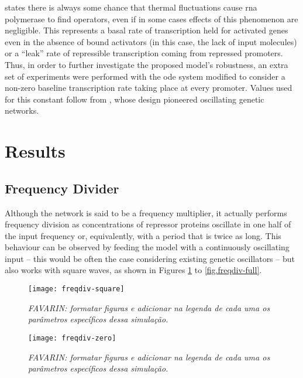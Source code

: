   \citet{ingalls} states there is always some chance that thermal fluctuations cause \acs{rna} polymerase to find operators, even if in some cases effects of this phenomenon are negligible.
  This represents a basal rate of transcription held for activated genes even in the absence of bound activators (in this case, the lack of input molecules) or a ``leak'' rate of repressible transcription coming from repressed promoters.
  Thus, in order to further investigate the proposed model's robustness, an extra set of experiments were performed with the \ac{ode} system modified to consider a non-zero baseline transcription rate taking place at every promoter.
  Values used for this constant follow from \citet{repressilator}, whose design pioneered oscillating genetic networks.


\section{Results}

  \subsection{Frequency Divider}

    Although the network is said to be a frequency multiplier, it actually performs frequency division as concentrations of repressor proteins oscillate in one half of the input frequency or, equivalently, with a period that is twice as long.
    This behaviour can be observed by feeding the model with a continuously oscillating input -- this would be often the case considering existing genetic oscillators -- but also works with square waves, as shown in Figures \ref{fig.freqdiv-square} to \ref{fig.freqdiv-full}.

    \begin{figure}[!htbp]
      \centering
      \texttt{[image: freqdiv-square]}
      \caption{\textit{FAVARIN: formatar figuras e adicionar na legenda de cada uma os parâmetros específicos dessa simulação.}}
      \label{fig.freqdiv-square}
    \end{figure}

    \begin{figure}[!htbp]
      \centering
      \texttt{[image: freqdiv-zero]}
      \caption{\textit{FAVARIN: formatar figuras e adicionar na legenda de cada uma os parâmetros específicos dessa simulação.}}
      \label{fig.freqdiv-zero}
    \end{figure}

